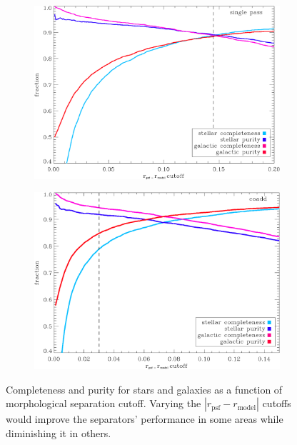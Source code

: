 \documentclass[12pt]{article}
\begin{document}
\begin{figure}[h!]
	\begin{subfigure}[h]{0.7\textwidth}
		\includegraphics[width=\textwidth]{final_figures/singlepass_cutoff.eps}
	\end{subfigure}
	
	\begin{subfigure}[h]{0.7\textwidth}
		\includegraphics[width=\textwidth]{final_figures/coadd_cutoff.eps}
	\end{subfigure}
	\caption{Completeness and purity for stars and galaxies as a function of morphological separation cutoff. Varying the $|r_{\mathrm{psf}} - r_{\mathrm{model}}|$ cutoffs would improve the separators' performance in some areas while diminishing it in others.}
	\label{cutoff}
\end{figure}
\end{document}
